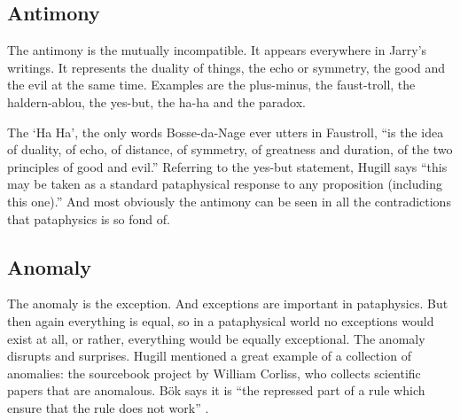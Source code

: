 

\subsection{Antimony}
\label{s:antinomy}

The antimony is the mutually incompatible. It appears everywhere in Jarry's writings. It represents the duality of things, the echo or symmetry, the good and the evil at the same time. Examples are the plus-minus, the faust-troll, the haldern-ablou, the yes-but, the ha-ha and the paradox.

The `Ha Ha', the only words Bosse-da-Nage ever utters in Faustroll, ``is the idea of duality, of echo, of distance, of symmetry, of greatness and duration, of the two principles of good and evil.'' \autocite{Hugill2012} Referring to the yes-but statement, Hugill says ``this may be taken as a standard pataphysical response to any proposition (including this one).'' And most obviously the antimony can be seen in all the contradictions that pataphysics is so fond of.


\subsection{Anomaly}
\label{s:anomaly}

The anomaly is the exception. And exceptions are important in pataphysics. But then again everything is equal, so in a pataphysical world no exceptions would exist at all, or rather, everything would be equally exceptional. The anomaly disrupts and surprises. Hugill mentioned a great example of a collection of anomalies: the sourcebook project by William Corliss, who collects scientific papers that are anomalous. Bök says it is ``the repressed part of a rule which ensure that the rule does not work'' \citeyear[p.38]{Bok2002}.


